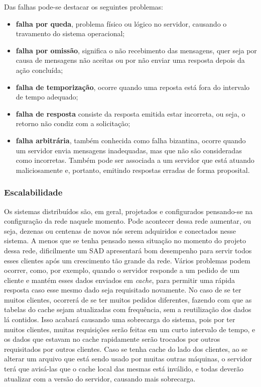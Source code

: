	Das falhas pode-se destacar os seguintes problemas:
	\begin{itemize}
		\item \textbf{falha por queda}, problema físico ou lógico no servidor, causando o travamento do sistema operacional;
		
		\item \textbf{falha por omissão}, significa o não recebimento das mensagens, quer seja por causa de mensagens não aceitas ou por não enviar uma resposta depois da ação concluída;
		
		\item \textbf{falha de temporização}, ocorre quando uma reposta está fora do intervalo de tempo adequado;
		
		\item \textbf{falha de resposta} consiste da resposta emitida estar incorreta, ou seja, o retorno não condiz com a solicitação;
		
		\item \textbf{falha arbitrária}, também conhecida como falha bizantina, ocorre quando um
		servidor envia mensagens inadequadas, mas que não são consideradas como incorretas.
		Também pode ser associada a um servidor que está atuando maliciosamente
		e, portanto, emitindo respostas erradas de forma proposital.
		
	\end{itemize}
	
	
	\subsubsection{Escalabilidade}
	Os sistemas distribuídos são, em geral, projetados e configurados pensando-se na configuração da rede naquele momento. Pode acontecer dessa rede aumentar, ou seja, dezenas ou centenas de novos nós serem adquiridos e conectados nesse sistema. A menos que se tenha pensado nessa situação no momento do projeto dessa rede, dificilmente um SAD apresentará bom desempenho para servir todos esses clientes após um crescimento tão grande da rede. Vários problemas podem ocorrer, como, por exemplo, quando o servidor responde a um pedido de um cliente e mantém esses dados enviados em \textit{cache}, para permitir uma rápida resposta caso esse mesmo dado seja requisitado novamente. No caso de se ter muitos clientes, ocorrerá de se ter muitos pedidos diferentes, fazendo com que as tabelas do cache sejam atualizadas com frequência, sem a reutilização dos dados lá contidos. Isso acabará causando uma sobrecarga do sistema, pois por ter muitos clientes, muitas requisições serão feitas em um curto intervalo de tempo, e os dados que estavam no cache rapidamente serão trocados por outros requisitados por outros clientes. Caso se tenha cache do lado dos clientes, ao se alterar um arquivo que está sendo usado por muitas outras máquinas, o servidor terá que avisá-las que o cache local das mesmas está inválido, e todas deverão atualizar com a versão do servidor, causando mais sobrecarga. \\
	
